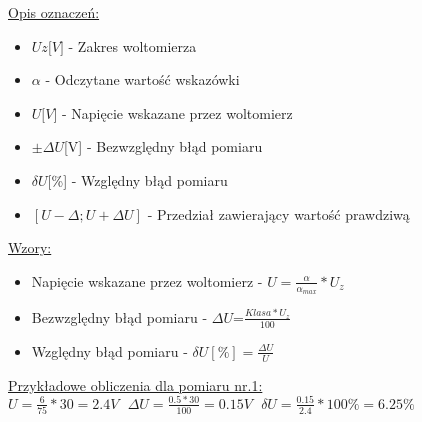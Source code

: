 \documentclass{extarticle}  %
\begin{document}
                \underline{Opis oznaczeń:}
                \begin{itemize}
                    \item $Uz{[}V{]}$ - Zakres woltomierza
                    \item $\alpha$ - Odczytane wartość wskazówki
                    \item $U{[}V{]}$ - Napięcie wskazane przez woltomierz
                    \item $\pm \Delta U${[}V{]} - Bezwzględny błąd pomiaru
                    \item $\delta U${[}\%{]} - Względny błąd pomiaru
                    \item $[U-\Delta ; U+\Delta U] $ - Przedział zawierający wartość prawdziwą
                \end{itemize}
                \underline{Wzory:}
                \begin{itemize}
                    \item Napięcie wskazane przez woltomierz - $U=\frac{\alpha}{\alpha_{max}}*U_z$
                    \item Bezwzględny błąd pomiaru - $ \Delta U$=$\frac{Klasa*U_z}{100}$
                    \item Względny błąd pomiaru - $\delta U[\%]=\frac{\Delta U}{U}$
                \end{itemize}

                \underline{Przykładowe obliczenia dla pomiaru nr.1:}\\
                $U=\frac{6}{75}\ast 30=2.4V \ \ \ \Delta U=\frac{0.5\ast 30}{100}=0.15V \ \ \ \delta U=\frac{0.15}{2.4}\ast 100\%=6.25\%$\\

                \begin{table}[H]
                    \caption{Wyniki pomiarowe oraz błędy pomiarowe dla ustalonego napięcia $\sim$2V dla woltomierza cyfrowego}
                    \centering
                \end{table}            
\end{document}

